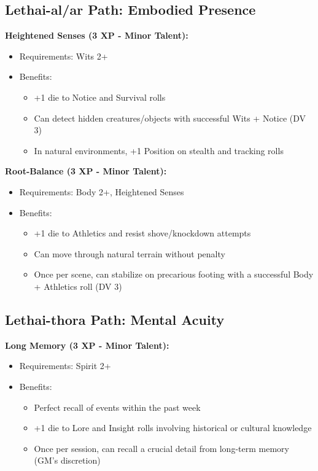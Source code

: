 \documentclass[11pt]{article}
\newcommand{\talent}[1]{\textbf{#1}}
\begin{document}
\subsection*{Lethai-al/ar Path: Embodied Presence}
\talent{Heightened Senses (3 XP - Minor Talent):}
\begin{itemize}
  \item Requirements: Wits 2+
  \item Benefits:
    \begin{itemize}
      \item +1 die to Notice and Survival rolls
      \item Can detect hidden creatures/objects with successful Wits + Notice (DV 3)
      \item In natural environments, +1 Position on stealth and tracking rolls
    \end{itemize}
\end{itemize}

\talent{Root-Balance (3 XP - Minor Talent):}
\begin{itemize}
  \item Requirements: Body 2+, Heightened Senses
  \item Benefits:
    \begin{itemize}
      \item +1 die to Athletics and resist shove/knockdown attempts
      \item Can move through natural terrain without penalty
      \item Once per scene, can stabilize on precarious footing with a successful Body + Athletics roll (DV 3)
    \end{itemize}
\end{itemize}

\subsection*{Lethai-thora Path: Mental Acuity}
\talent{Long Memory (3 XP - Minor Talent):}
\begin{itemize}
  \item Requirements: Spirit 2+
  \item Benefits:
    \begin{itemize}
      \item Perfect recall of events within the past week
      \item +1 die to Lore and Insight rolls involving historical or cultural knowledge
      \item Once per session, can recall a crucial detail from long-term memory (GM's discretion)
    \end{itemize}
\end{itemize}
\end{document}
